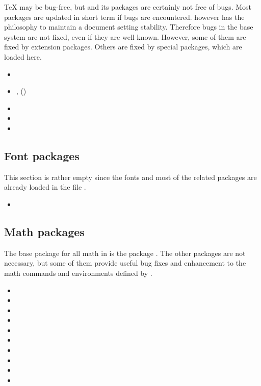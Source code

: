 \TeX{} may be bug-free, but \latex and its packages are certainly not free of bugs.  Most packages are updated in short term if bugs are encountered. \latex however has the philosophy to maintain a document setting stability. Therefore bugs in the base \latex system are not fixed, even if they are well known. However, some of them are fixed by extension packages. Others are fixed by special packages, which are loaded here.

\begin{itemize}[noitemsep]
\item {}
\item {}, ()
\item {}
\item {}
\item {}
\end{itemize}


\subsection{Font packages}
This section is rather empty since the fonts and most of the related packages are already loaded in the file .

\begin{itemize}[noitemsep]
\item {}
\end{itemize}


\subsection{Math packages}
The base package for all math in \latex is the package . The other packages are not necessary, but some of them provide useful bug fixes and enhancement to the math commands and environments defined by .

\begin{itemize}[noitemsep]
\item {}
\item {}
\item {}
\item {}
\item {}
\item {}
\item {}
\item {}
\item {}
\item {}
\end{itemize}

